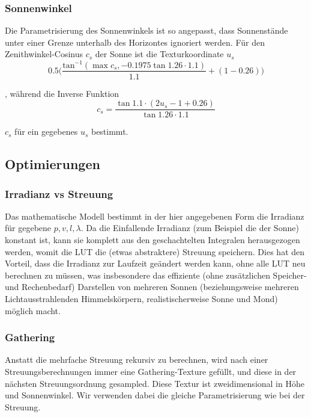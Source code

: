 \subsubsection{Sonnenwinkel}
Die Parametrisierung des Sonnenwinkels ist so angepasst, dass Sonnenstände unter einer Grenze unterhalb des Horizontes
ignoriert werden. Für den Zenithwinkel-Cosinus $c_s$ der Sonne ist die Texturkoordinate $u_s$
\begin{equation*}
	0.5 \Big(\frac{\text{tan}^{-1}(\max{c_s, -0.1975}\tan{1.26 \cdot 1.1})}{1.1}+(1-0.26)\Big)
\end{equation*}

, während die Inverse Funktion
\begin{equation*}
	c_s = \frac{\tan{1.1 \cdot (2u_s-1+0.26)}}{\tan{1.26 \cdot 1.1}}
\end{equation*}

$c_s$ für ein gegebenes $u_s$ bestimmt.

\subsection{Optimierungen}

\subsubsection{Irradianz vs Streuung}
Das mathematische Modell bestimmt in der hier angegebenen Form die Irradianz für gegebene $p,v,l,\lambda$. Da die
Einfallende Irradianz (zum Beispiel die der Sonne) konstant ist, kann sie komplett aus den geschachtelten Integralen
herausgezogen werden, womit die LUT die (etwas abstraktere) Streuung speichern. Dies hat den Vorteil, dass die Irradianz
zur Laufzeit geändert werden kann, ohne alle LUT neu berechnen zu müssen, was insbesondere das effiziente (ohne
zusätzlichen Speicher- und Rechenbedarf) Darstellen von mehreren Sonnen (beziehungsweise mehreren Lichtausstrahlenden
Himmelskörpern, realistischerweise Sonne und Mond) möglich macht.

\subsubsection{Gathering}
Anstatt die mehrfache Streuung rekursiv zu berechnen, wird nach einer Streuungsberechnungen immer eine Gathering-Texture
gefüllt, und diese in der nächsten Streuungsordnung gesampled. Diese Textur ist zweidimensional in Höhe und
Sonnenwinkel. Wir verwenden dabei die gleiche Parametrisierung wie bei der Streuung.

